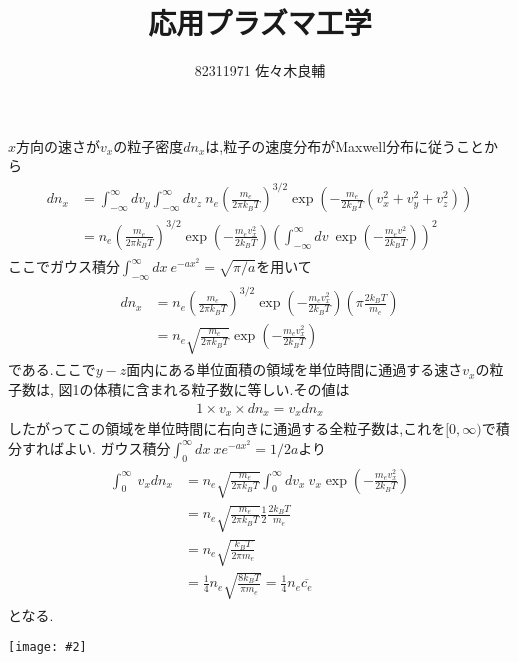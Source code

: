 \documentclass[uplatex,a4j,11pt,dvipdfmx]{jsarticle}
\makeatletter
\def\fgcaption{\def\@captype{figure}\caption}
\newcommand{\mfig}[3][width=15cm]{
\begin{center}
\texttt{[image: \#2]}
\fgcaption{#3 \label{fig:#2}}
\end{center}
}
\makeatother
\begin{document}
\title{応用プラズマ工学}
\author{82311971 佐々木良輔}
\date{}
\maketitle
$x$方向の速さが$v_x$の粒子密度$dn_x$は,粒子の速度分布がMaxwell分布に従うことから
\begin{align}
  \begin{split}
    dn_x&=\int_{-\infty}^{\infty}dv_y\int_{-\infty}^{\infty}dv_z\ n_e\left(\frac{m_e}{2\pi k_BT}\right)^{3/2}\exp\left(-\frac{m_e}{2k_BT}(v_x^2+v_y^2+v_z^2)\right)\\
    &=n_e\left(\frac{m_e}{2\pi k_BT}\right)^{3/2}\exp\left(-\frac{m_ev_x^2}{2k_BT}\right)\left(\int_{-\infty}^{\infty}dv\ \exp\left(-\frac{m_ev^2}{2k_BT}\right)\right)^2
  \end{split}
\end{align}
ここでガウス積分$\int_{-\infty}^{\infty}dx\ e^{-ax^2}=\sqrt{\pi/a}$を用いて
\begin{align}
  \begin{split}
    dn_x&=n_e\left(\frac{m_e}{2\pi k_BT}\right)^{3/2}\exp\left(-\frac{m_ev_x^2}{2k_BT}\right)\left(\pi\frac{2k_BT}{m_e}\right)\\
    &=n_e\sqrt{\frac{m_e}{2\pi k_BT}}\exp\left(-\frac{m_ev_x^2}{2k_BT}\right)
  \end{split}
\end{align}
である.ここで$y-z$面内にある単位面積の領域を単位時間に通過する速さ$v_x$の粒子数は,
図1の体積に含まれる粒子数に等しい.その値は
\begin{align}
  1\times v_x\times dn_x=v_xdn_x
\end{align}
したがってこの領域を単位時間に右向きに通過する全粒子数は,これを$[0,\infty)$で積分すればよい.
ガウス積分$\int_{0}^{\infty}dx\ xe^{-ax^2}=1/2a$より
\begin{align}
  \begin{split}
    \int_{0}^{\infty}\ v_xdn_x&=
    n_e\sqrt{\frac{m_e}{2\pi k_BT}}\int_{0}^{\infty}dv_x\ v_x\exp\left(-\frac{m_ev_x^2}{2k_BT}\right)\\&=
    n_e\sqrt{\frac{m_e}{2\pi k_BT}}\frac{1}{2}\frac{2k_BT}{m_e}\\
    &=n_e\sqrt{\frac{k_BT}{2\pi m_e}}\\
    &=\frac{1}{4}n_e\sqrt{\frac{8k_BT}{\pi m_e}}=\frac{1}{4}n_e\overline{c_e}
  \end{split}
\end{align}
となる.
\mfig[width=8cm]{vol.png}{単位時間に単位面積を通過する粒子が含まれる体積}

\end{document}
